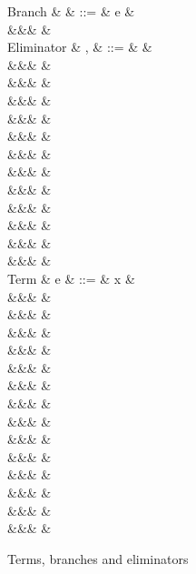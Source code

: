 \begin{figure}
\begin{syntaxfig}
\mbox{Branch}
&
\kappa
&
::=
&
e
&
\\
&&&
\sigma
&
\\[2mm]
\mbox{Eliminator}
&
\sigma, \tau
&
::=
&
&
\\
&&&
&
\\[1mm]
&&&
\elimUnit{\kappa}
&
\\
&&&
\elimUnitProj{\kappa}
&
\\[1mm]
&&&
\elimSum{\sigma}{\tau}
&
\\
&&&
\elimSumOnlyL{\sigma}{\tau}
&
\\
&&&
\elimSumProjL{\sigma}{\tau}
&
\\
&&&
\elimSumOnlyR{\sigma}{\tau}
&
\\
&&&
\elimSumProjR{\sigma}{\tau}
&
\\[1mm]
&&&
\elimProd{\sigma}
&
\\
&&&
\elimProdProj{\sigma}
&
\\[1mm]
&&&
\elimRoll{\sigma}
&
\\
&&&
\elimRollProj{\sigma}
&
\\[2mm]
\mbox{Term}
&
e
&
::=
&
x
&
\\[1mm]
&&&
\exUnit
&
\\[1mm]
&&&
&
\\
&&&
&
\\[1mm]
&&&
&
\\
&&&
&
\\[1mm]
&&&
&
\\
&&&
&
\\
&&&
&
\\[1mm]
&&&
\exFun{\sigma}
&
\\
&&&
\exFunProj{\elimSingletonProj{\sigma}{\exFun{\tau}}}
&
\\[1mm]
&&&
&
\\
&&&
&
\\[1mm]
&&&
&
\\
&&&
&
\end{syntaxfig}
\caption{Terms, branches and eliminators}
\end{figure}
